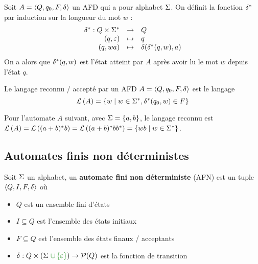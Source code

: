 \begin{definition}
	Soit $A = \langle Q, q_0, F, \delta \rangle$ un AFD qui a pour alphabet $\Sigma$. On définit la fonction $\delta^{*}$ par induction sur la longueur du mot $w$ :
	$$ \begin{array}{rcl}
			\delta^{*} : Q \times \Sigma^{*} & \to     & Q                               \\
			(q, \varepsilon)                   & \mapsto & q                               \\
			(q, wa)                         & \mapsto & \delta(\delta^{*}(q, w), a)
		\end{array} $$
	On a alors que $\delta^{*}(q, w)$ est l'état atteint par $A$ après avoir lu le mot $w$ depuis l'état $q$.
\end{definition}

\begin{definition}
	Le langage reconnu / accepté par un AFD $A = \langle Q, q_0, F, \delta \rangle$ est le langage
	$$ \mathcal{L}\left(A\right) = \left\{w \mid w \in \Sigma^{*}, \delta^{*}(q_0, w) \in F\right\} $$
\end{definition}

\begin{exemple}
	Pour l'automate $A$ suivant, avec $\Sigma = \left\{a,b\right\}$, le langage reconnu est $\mathcal{L}\left(A\right) = \mathcal{L}\left((a + b)^{*} b\right) = \mathcal{L}\left((a + b)^{*} b b^{*}\right) = \left\{wb \mid w \in \Sigma^{*}\right\}$.

	\begin{center}
	\end{center}
\end{exemple}

\subsection{Automates finis non déterministes }

\begin{definition}
	Soit $\Sigma$ un alphabet, un \textbf{automate fini non déterministe} (AFN) est un tuple $\langle Q, I, F, \delta \rangle$ où
	\begin{itemize}
		\item $Q$ est un ensemble fini d'états
		\item $I \subseteq Q$ est l'ensemble des états initiaux
		\item $F \subseteq Q$ est l'ensemble des états finaux / acceptants
		\item $\delta : Q \times (\alphabet \darkgreen {\ \cup \set\motvide}) \to \mathcal{P}(Q)$ est la fonction de transition
	\end{itemize}
\end{definition}


